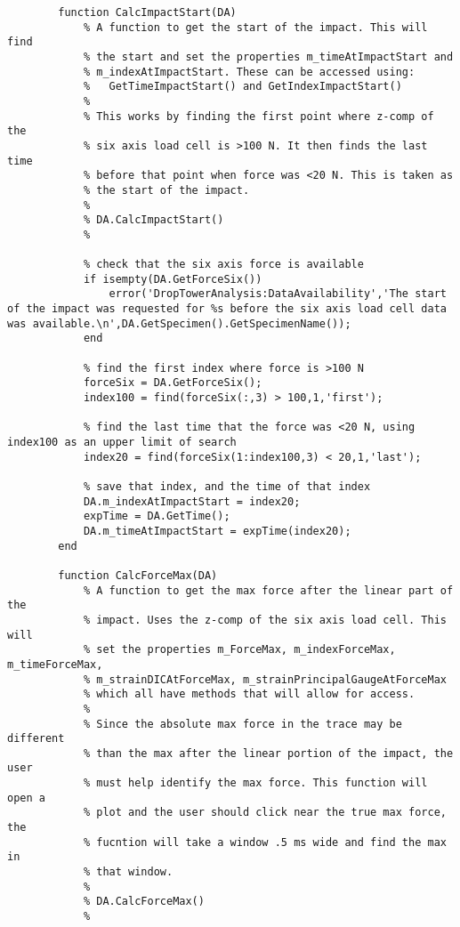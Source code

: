 \begin{lstlisting}
        function CalcImpactStart(DA)
            % A function to get the start of the impact. This will find
            % the start and set the properties m_timeAtImpactStart and
            % m_indexAtImpactStart. These can be accessed using:
            %   GetTimeImpactStart() and GetIndexImpactStart()
            %
            % This works by finding the first point where z-comp of the 
            % six axis load cell is >100 N. It then finds the last time
            % before that point when force was <20 N. This is taken as
            % the start of the impact.
            %
            % DA.CalcImpactStart()
            %
            
            % check that the six axis force is available
            if isempty(DA.GetForceSix())
                error('DropTowerAnalysis:DataAvailability','The start of the impact was requested for %s before the six axis load cell data was available.\n',DA.GetSpecimen().GetSpecimenName());
            end
            
            % find the first index where force is >100 N
            forceSix = DA.GetForceSix();
            index100 = find(forceSix(:,3) > 100,1,'first');
            
            % find the last time that the force was <20 N, using index100 as an upper limit of search
            index20 = find(forceSix(1:index100,3) < 20,1,'last');
            
            % save that index, and the time of that index
            DA.m_indexAtImpactStart = index20;
            expTime = DA.GetTime();
            DA.m_timeAtImpactStart = expTime(index20);
        end
        
        function CalcForceMax(DA)
            % A function to get the max force after the linear part of the 
            % impact. Uses the z-comp of the six axis load cell. This will 
            % set the properties m_ForceMax, m_indexForceMax, m_timeForceMax,
            % m_strainDICAtForceMax, m_strainPrincipalGaugeAtForceMax
            % which all have methods that will allow for access.
            %
            % Since the absolute max force in the trace may be different
            % than the max after the linear portion of the impact, the user
            % must help identify the max force. This function will open a
            % plot and the user should click near the true max force, the
            % fucntion will take a window .5 ms wide and find the max in
            % that window.
            % 
            % DA.CalcForceMax()
            %
            

\end{lstlisting}
